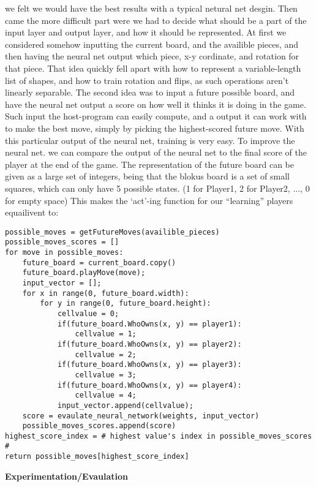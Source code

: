 \documentclass{report}
\begin{document}
	we felt we would have the best results with a typical netural net desgin. Then came the more difficult part were we had to decide what should be a part of the input layer and output layer,
	and how it should be represented. At first we considered somehow inputting the current board, and the availible pieces, and then having the neural net output which piece, x-y cordinate,
	and rotation for that piece. That idea quickly fell apart with how to represent a variable-length list of shapes, and how to train rotation and flips, as such operations aren't linearly
	separable. The second idea was to input a future possible board, and have the neural net output a score on how well it thinks it is doing in the game. Such input the host-program can easily
	compute, and a output it can work with to make the best move, simply by picking the highest-scored future move. With this particular output of the neural net, training is very easy. To
	improve the neural net. we can compare the output of the neural net to the final score of the player at the end of the game. The representation of the future board can be given as a large set of
	integers, being that the blokus board is a set of small squares, which can only have 5 possible states. (1 for Player1, 2 for Player2, ..., 0 for empty space) This makes the `act'-ing
	function for our ``learning'' players equailivent to:
	\lstset{language=Python}
	\lstset{basicstyle=\footnotesize}
	\begin{lstlisting}
possible_moves = getFutureMoves(availible_pieces)
possible_moves_scores = []
for move in possible_moves:
	future_board = current_board.copy()
	future_board.playMove(move);
	input_vector = [];
	for x in range(0, future_board.width):
		for y in range(0, future_board.height):
			cellvalue = 0;
			if(future_board.WhoOwns(x, y) == player1):
				cellvalue = 1;
			if(future_board.WhoOwns(x, y) == player2):
				cellvalue = 2;
			if(future_board.WhoOwns(x, y) == player3):
				cellvalue = 3;
			if(future_board.WhoOwns(x, y) == player4):
				cellvalue = 4;
			input_vector.append(cellvalue);
	score = evaulate_neural_network(weights, input_vector)
	possible_moves_scores.append(score)
highest_score_index = # highest value's index in possible_moves_scores #
return possible_moves[highest_score_index]
	\end{lstlisting}
	
	\textbf{Experimentation/Evaulation}\\
	\blindtext\\
	
\end{document}
